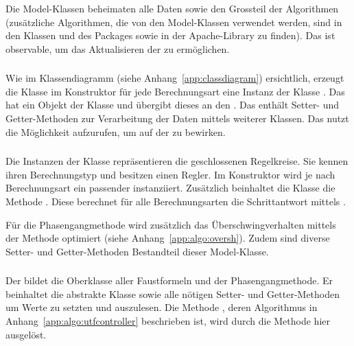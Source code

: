 Die Model-Klassen  beheimaten alle Daten  sowie den Grossteil  der Algorithmen
(zus\"atzliche Algorithmen,  die von den Model-Klassen  verwendet werden, sind
in den Klassen   und  des Packages 
sowie in  der Apache-Library zu  finden). Das  ist  observable, um
das Aktualisieren der  zu erm\"oglichen.

\subsubsection*{}
Wie  im  Klassendiagramm  (siehe  Anhang~\ref{app:classdiagram})  ersichtlich,
erzeugt  die  Klasse   im  Konstruktor  f\"ur jede  Berechnungsart
eine  Instanz der  Klasse . Das   hat  ein Objekt
der  Klasse   und \"ubergibt  dieses an  den . Das
  enth\"alt  Setter-  und  Getter-Methoden  zur  Verarbeitung  der
Daten  mittels  weiterer  Klassen. Das   nutzt  die  M\"oglichkeit
 aufzurufen, um  auf der  zu
bewirken.


\subsubsection*{}
Die    Instanzen   der    Klasse       repr\"asentieren   die
geschlossenen  Regelkreise. Sie  kennen   ihren  Berechnungstyp  und  besitzen
einen  Regler. Im  Konstruktor  wird  je  nach  Berechnungsart  ein  passender
   instanziiert. Zus\"atzlich  beinhaltet   die  Klasse   die
Methode  . Diese   berechnet  f\"ur   alle  Berechnungsarten
die    Schrittantwort    mittels   .

F\"ur  die  Phasengangmethode  wird  zus\"atzlich  das  \"Uberschwingverhalten
mittels   der   Methode       optimiert   (siehe
Anhang~\ref{app:algo:oversh}).  Zudem sind diverse Setter- und Getter-Methoden
Bestandteil dieser Model-Klasse.


\subsubsection*{}
Der    bildet  die  Oberklasse  aller  Faustformeln  und  der
Phasengangmethode. Er  beinhaltet  die   abstrakte  Klasse  
sowie  alle  n\"otigen  Setter-  und   Getter-Methoden  um  Werte  zu  setzten
und  auszulesen.  Die  Methode  ,  deren Algorithmus  in
Anhang~\ref{app:algo:utfcontroller}  beschrieben ist,  wird durch  die Methode
 hier ausgel\"ost.


